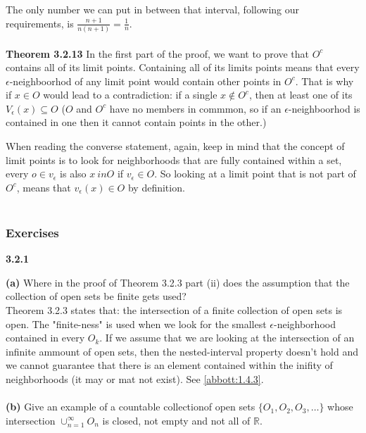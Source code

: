 The only number we can put in between that interval, following our requirements, is $\frac{n+1}{n(n+1)} = \frac{1}{n}$.
\\~\\


\textbf{Theorem 3.2.13}
In the first part of the proof, we want to prove that $O^c$ contains all of its limit points.
Containing all of its limits points means that every $\epsilon$-neighboorhod of any limit point would
contain other points in $O^c$.
That is why if $x\in O$ would lead to a contradiction: if a single $x \notin O^c$, then at least one of its
$V_\epsilon (x) \subseteq O$ ($O$ and $O^c$ have no members in commmon, so if an $\epsilon$-neighboorhod is contained
in one then it cannot contain points in the other.)

When reading the converse statement, again, keep in mind that the concept of limit points is to look for
neighborhoods that are fully contained within a set, every $o \in v_\epsilon $ is also $x \ in O$ if
$v_\epsilon \in O$.
So looking at a limit point that is not part of $O^c$, means that $v_{\epsilon} (x) \in O$ by definition.
\\~\\


\subsubsection{Exercises}

\textbf{3.2.1}

\textbf{(a)} Where in the proof of Theorem 3.2.3 part (ii) does the assumption that the collection of
open sets be finite gets used?
\\

Theorem 3.2.3 states that: the intersection of a finite collection of open sets is open.
The "finite-ness" is used when we look for the smallest $\epsilon$-neighborhood contained in every $O_k$.
If we assume that we are looking at the intersection of an infinite ammount of open sets, then the nested-interval
property doesn't hold and we cannot guarantee that there is an element contained within the inifity of neighborhoods (it may or mat not exist).
See \ref{abbott:1.4.3}.
\\~\\

\textbf{(b)} Give an example of a countable collectionof open sets $\{O_1, O_2, O_3, \ldots\}$
whose intersection $\cup^{\infty}_{n=1} O_n$ is closed, not empty and not all of $\mathbb{R}$.
\\




